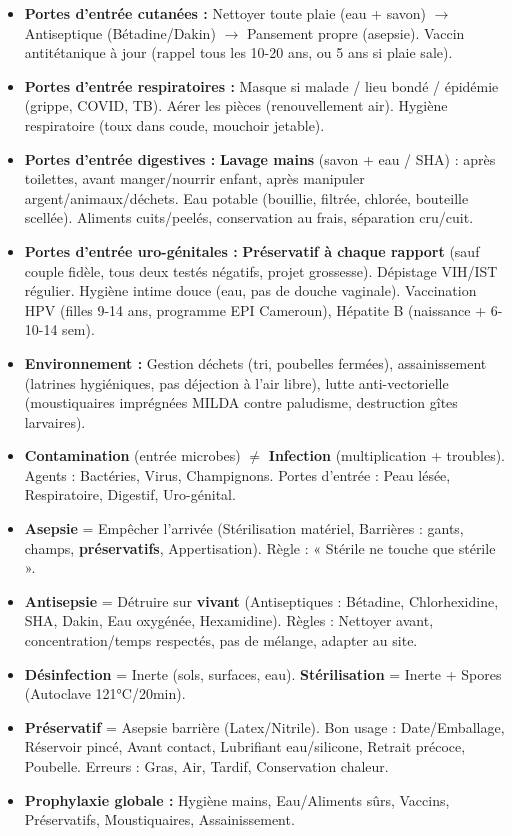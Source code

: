 \documentclass[11pt]{article}
\begin{document}
\begin{itemize}
    \item \textbf{Portes d'entrée cutanées :} Nettoyer toute plaie (eau + savon) $\rightarrow$ Antiseptique (Bétadine/Dakin) $\rightarrow$ Pansement propre (asepsie). Vaccin antitétanique à jour (rappel tous les 10-20 ans, ou 5 ans si plaie sale).
    \item \textbf{Portes d'entrée respiratoires :} Masque si malade / lieu bondé / épidémie (grippe, COVID, TB). Aérer les pièces (renouvellement air). Hygiène respiratoire (toux dans coude, mouchoir jetable).
    \item \textbf{Portes d'entrée digestives :} \textbf{Lavage mains} (savon + eau / SHA) : après toilettes, avant manger/nourrir enfant, après manipuler argent/animaux/déchets. Eau potable (bouillie, filtrée, chlorée, bouteille scellée). Aliments cuits/peelés, conservation au frais, séparation cru/cuit.
    \item \textbf{Portes d'entrée uro-génitales :} \textbf{Préservatif à chaque rapport} (sauf couple fidèle, tous deux testés négatifs, projet grossesse). Dépistage VIH/IST régulier. Hygiène intime douce (eau, pas de douche vaginale). Vaccination HPV (filles 9-14 ans, programme EPI Cameroun), Hépatite B (naissance + 6-10-14 sem).
    \item \textbf{Environnement :} Gestion déchets (tri, poubelles fermées), assainissement (latrines hygiéniques, pas déjection à l'air libre), lutte anti-vectorielle (moustiquaires imprégnées MILDA contre paludisme, destruction gîtes larvaires).
\end{itemize}

\begin{aretenir}
\begin{itemize}
    \item \textbf{Contamination} (entrée microbes) $\neq$ \textbf{Infection} (multiplication + troubles). Agents : Bactéries, Virus, Champignons. Portes d'entrée : Peau lésée, Respiratoire, Digestif, Uro-génital.
    \item \textbf{Asepsie} = Empêcher l'arrivée (Stérilisation matériel, Barrières : gants, champs, \textbf{préservatifs}, Appertisation). Règle : « Stérile ne touche que stérile ».
    \item \textbf{Antisepsie} = Détruire sur \textbf{vivant} (Antiseptiques : Bétadine, Chlorhexidine, SHA, Dakin, Eau oxygénée, Hexamidine). Règles : Nettoyer avant, concentration/temps respectés, pas de mélange, adapter au site.
    \item \textbf{Désinfection} = Inerte (sols, surfaces, eau). \textbf{Stérilisation} = Inerte + Spores (Autoclave 121°C/20min).
    \item \textbf{Préservatif} = Asepsie barrière (Latex/Nitrile). Bon usage : Date/Emballage, Réservoir pincé, Avant contact, Lubrifiant eau/silicone, Retrait précoce, Poubelle. Erreurs : Gras, Air, Tardif, Conservation chaleur.
    \item \textbf{Prophylaxie globale :} Hygiène mains, Eau/Aliments sûrs, Vaccins, Préservatifs, Moustiquaires, Assainissement.
\end{itemize}
\end{aretenir}
\end{document}
